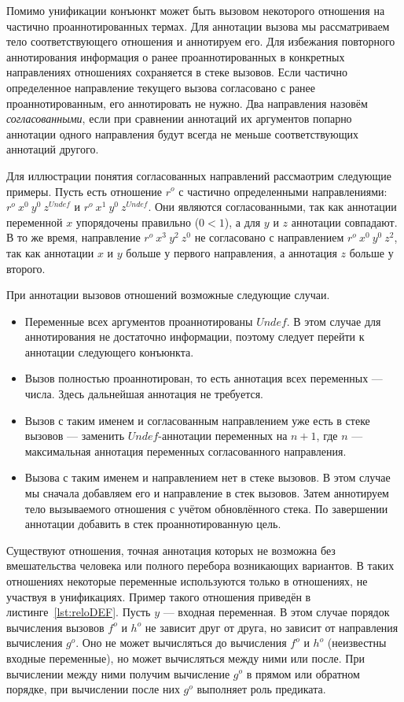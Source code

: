 \documentclass[conference,american,russian]{IEEEtran}
\begin{document}
Помимо унификации конъюнкт может быть вызовом некоторого отношения на частично проаннотированных термах. 
Для аннотации вызова мы рассматриваем тело соответствующего отношения и аннотируем его. 
Для избежания повторного аннотирования информация о ранее проаннотированных в конкретных направлениях отношениях сохраняется в стеке вызовов.
Если частично определенное направление текущего вызова согласовано с ранее проаннотированным, его аннотировать не нужно.  
Два направления назовём \emph{согласованными}, если при сравнении аннотаций их аргументов попарно аннотации одного направления будут всегда не меньше соответствующих аннотаций другого.

Для иллюстрации понятия согласованных направлений рассмаотрим следующие примеры. 
Пусть есть отношение $r^o$ с частично определенными направлениями: $r^o \ x^0 \ y^0 \ z^{Undef}$ и $r^o \ x^1 \ y^0 \ z^{Undef}$.
Они являются согласованными, так как аннотации переменной $x$ упорядочены правильно ($0 < 1$), а для $y$ и $z$ аннотации совпадают.
В то же время, направление $r^o \ x^3 \ y^2 \ z^0$ не согласовано с направлением $r^o \ x^0 \ y^0 \ z^2$, так как аннотации $x$ и $y$ больше у первого направления, а аннотация $z$ больше у второго.

При аннотации вызовов отношений возможные следующие случаи. 
\begin{itemize}
    \item Переменные всех аргументов проаннотированы $Undef$. В этом случае для аннотирования не достаточно информации, поэтому следует перейти к аннотации следующего конъюнкта. 
    \item Вызов полностью проаннотирован, то есть аннотация всех переменных --- числа. Здесь дальнейшая аннотация не требуется.
    \item Вызов с таким именем и согласованным направлением уже есть в стеке вызовов --- заменить $Undef$-аннотации переменных на $n+1$, где $n$ --- максимальная аннотация переменных согласованного направления.
    \item Вызова с таким именем и направлением нет в стеке вызовов.
    В этом случае мы сначала добавляем его и направление в стек вызовов. 
    Затем аннотируем тело вызываемого отношения с учётом обновлённого стека. 
    По завершении аннотации добавить в стек проаннотированную цель.
\end{itemize}

Существуют отношения, точная аннотация которых не возможна без вмешательства человека или полного перебора возникающих вариантов. 
В таких отношениях некоторые переменные используются только в отношениях, не участвуя в унификациях.
Пример такого отношения приведён в листинге~\ref{lst:reloDEF}.
Пусть $y$ --- входная переменная.
В этом случае порядок вычисления вызовов $f^o$ и $h^o$ не зависит друг от друга, но зависит от направления вычисления $g^o$.
Оно не может вычисляться до вычисления $f^o$ и $h^o$ (неизвестны входные переменные), но может вычисляться между ними или после.
При вычислении между ними получим вычисление $g^o$ в прямом или обратном порядке, при вычислении после них $g^o$ выполняет роль предиката.
\end{document}
